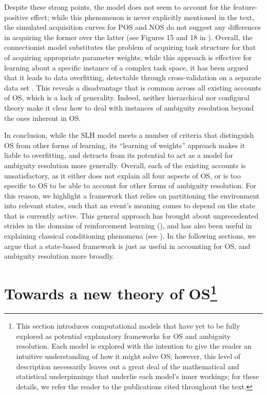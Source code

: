 \documentclass[11pt]{article}
\let\cite=\citep
\let\citeNP=\citealt
\begin{document}
Despite these strong points, the model does not seem to account for the 
feature-positive effect; while this phenomenon is never explicitly mentioned in 
the text, the simulated acquisition curves for POS and NOS do not suggest any 
differences in acquiring the former over the latter (see Figures 15 and 18 in 
\citeNP{Schmajuk1998}). Overall, the connectionist model substitutes the 
problem of acquiring task structure for that of acquiring appropriate parameter 
weights; while this approach is effective for learning about a specific 
instance of a complex task space, it has been argued that it leads to data 
overfitting, detectable through cross-validation on a separate data set 
\cite{Fuhs2007}. This reveals a disadvantage that is common across all existing 
accounts of OS, which is a lack of generality. Indeed, neither hierarchical nor 
configural theory make it clear how to deal with instances of ambiguity 
resolution beyond the ones inherent in OS. 

In conclusion, while the SLH model meets a number of criteria that distinguish 
OS from other forms of learning, its ``learning of weights'' approach makes it 
liable to overfitting, and detracts from its potential to act as a model for 
ambiguity resolution more generally. Overall, each of the existing accounts is 
unsatisfactory, as it either does not explain all four aspects of OS, or is too 
specific to OS to be able to account for other forms of ambiguity resolution. 
For this reason, we highlight a framework that relies on partitioning the 
environment into relevant states, such that an event's meaning comes to depend 
on the state that is currently active. This general approach has brought about 
unprecedented strides in the domains of reinforcement learning 
(\citeNP{Sutton1998,Maia2009}), and has also been useful in explaining 
classical conditioning phenomena (see 
\citeNP{Courville2006,Redish2007,Fuhs2007,Gershman2010,Gershman2010a,Gershman2012}). 
In the following sections, we argue that a state-based framework is just as 
useful in accounting for OS, and ambiguity resolution more broadly.

\section*{Towards a new theory of OS\footnote{This section introduces computational models that have yet to be fully explored as potential explanatory frameworks for OS and ambiguity resolution. Each model is explored with the intention to give the reader an intuitive understanding of how it might solve OS; however, this level of description necessarily leaves out a great deal of the mathematical and statistical underpinnings that underlie each model's inner workings; for these details, we refer the reader to the publications cited throughout the text.}}
\end{document}
